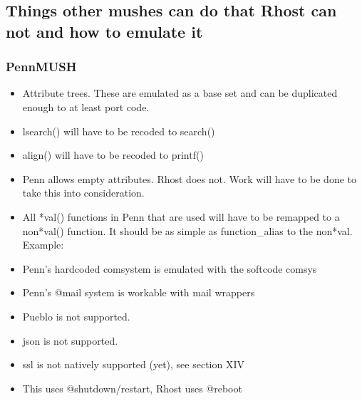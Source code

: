 \documentclass[letterpaper,10pt,english]{sphinxmanual}
\begin{document}
\subsection{Things other mushes can do that Rhost can not and how to emulate it}
\label{\detokenize{features:things-other-mushes-can-do-that-rhost-can-not-and-how-to-emulate-it}}

\subsubsection{PennMUSH}
\label{\detokenize{features:pennmush}}\begin{itemize}
\item {} 
\sphinxAtStartPar
Attribute trees.  These are emulated as a base set and can be duplicated enough to at least port code.

\item {} 
\sphinxAtStartPar
lsearch() will have to be recoded to search()

\item {} 
\sphinxAtStartPar
align() will have to be recoded to printf()

\item {} 
\sphinxAtStartPar
Penn allows empty attributes.  Rhost does not.  Work will have to
be done to take this into consideration.

\item {} 
\sphinxAtStartPar
All *val() functions in Penn that are used will have to be remapped to a non\sphinxhyphen{}*val() function.  It should be as simple as function\_alias to the non\sphinxhyphen{}*val.  Example:

\begin{sphinxVerbatim}[commandchars=\\\{\}]
  
\end{sphinxVerbatim}

\item {} 
\sphinxAtStartPar
Penn’s hardcoded comsystem is emulated with the softcode comsys

\item {} 
\sphinxAtStartPar
Penn’s @mail system is workable with mail wrappers

\item {} 
\sphinxAtStartPar
Pueblo is not supported.

\item {} 
\sphinxAtStartPar
json is not supported.

\item {} 
\sphinxAtStartPar
ssl is not natively supported (yet), see section XIV

\item {} 
\sphinxAtStartPar
This uses @shutdown/restart, Rhost uses @reboot

\end{itemize}
\end{document}
